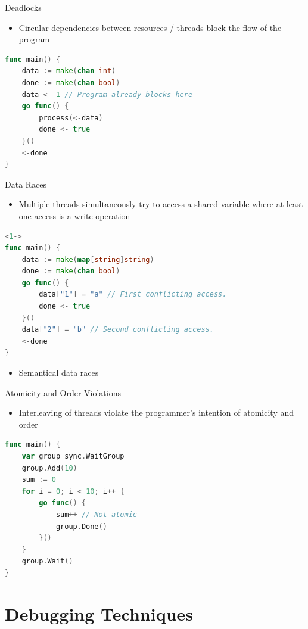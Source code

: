 \documentclass[english,aspectratio=43,t]{beamer}
\begin{document}
\begin{frame}[fragile]{Deadlocks}
\begin{itemize}
    \item Circular dependencies between resources / threads block the flow of the program
\end{itemize}
\begin{lstlisting}[language=Go]
func main() {
    data := make(chan int)
    done := make(chan bool)
    data <- 1 // Program already blocks here
    go func() {
        process(<-data)
        done <- true
    }()
    <-done
}
\end{lstlisting}
\end{frame}

\begin{frame}[fragile]{Data Races}
\begin{itemize}
    \item<1-> Multiple threads simultaneously try to access a shared variable where at least one access is a write operation~\cite{serebry2009threadsanitizer}
\end{itemize}
\begin{lstlisting}[language=Go]<1->
func main() {
	data := make(map[string]string)
	done := make(chan bool)
	go func() {
		data["1"] = "a" // First conflicting access.
		done <- true
	}()
	data["2"] = "b" // Second conflicting access.
	<-done
}
\end{lstlisting}
\begin{itemize}
    \item<2-> Semantical data races
\end{itemize}
\end{frame}

\begin{frame}[fragile]{Atomicity and Order Violations}
\begin{itemize}
    \item Interleaving of threads violate the programmer's intention of atomicity and order
\end{itemize}
\begin{lstlisting}[language=Go]
func main() {
    var group sync.WaitGroup
    group.Add(10)
    sum := 0
    for i = 0; i < 10; i++ {
        go func() {
            sum++ // Not atomic
            group.Done()
        }()
    }
    group.Wait()
}
\end{lstlisting}
\end{frame}

\section{Debugging Techniques}
\end{document}
